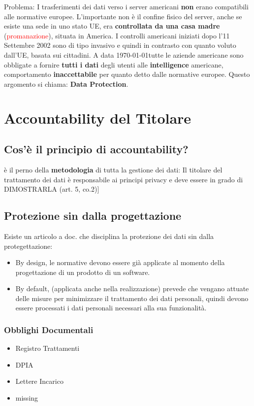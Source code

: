 \documentclass[twocolumn]{article}
\begin{document}
Problema: I trasferimenti dei dati verso i server americani \textbf{non} erano compatibili alle normative europee. L'importante non è il confine fisico del server, anche se esiste una sede in uno stato UE, era \textbf{controllata da una casa madre} (\textcolor{red}{promanazione}), situata in America. I controlli americani iniziati dopo l'11 Settembre 2002 sono di tipo invasivo e quindi in contrasto con quanto voluto dall'UE, basata sui cittadini. A data  \today tutte le aziende americane sono obbligate a fornire \textbf{tutti i dati} degli utenti alle \textbf{intelligence} americane, comportamento \textbf{inaccettabile} per quanto detto dalle normative europee. Questo argomento si chiama: \textbf{\large Data Protection}.
\section{Accountability del Titolare}
\subsection{ Cos'è il principio di accountability?} è il perno della \textbf{metodologia} di tutta la gestione dei dati: Il titolare del trattamento dei dati è responsabile ai principi privacy e deve essere in grado di DIMOSTRARLA (art. 5, co.2)]
\subsection{Protezione sin dalla progettazione}
Esiste un articolo a doc. che disciplina la protezione dei dati sin dalla protegettazione: \begin{itemize}
    \item By design, le normative devono essere già applicate al momento della progettazione di un prodotto di un software.
    \item By default, (applicata anche nella realizzazione) prevede che vengano attuate delle misure per minimizzare il trattamento dei dati personali, quindi devono essere processati i dati personali necessari alla sua funzionalità.
\end{itemize}
\subsubsection{Obblighi Documentali}
\begin{itemize}
    \item Registro Trattamenti
    \item DPIA
    \item Lettere Incarico
    \item missing
\end{itemize}
\end{document}
